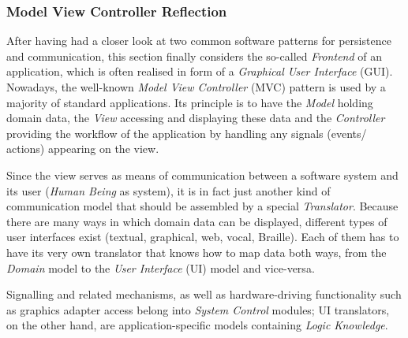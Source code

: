 %
%
%
%
%
%
%

\subsubsection{Model View Controller Reflection}
\label{model_view_controller_reflection_heading}

After having had a closer look at two common software patterns for persistence
and communication, this section finally considers the so-called \emph{Frontend}
of an application, which is often realised in form of a
\emph{Graphical User Interface} (GUI). Nowadays, the well-known
\emph{Model View Controller} (MVC) pattern is used by a majority of standard
applications. Its principle is to have the \emph{Model} holding domain data,
the \emph{View} accessing and displaying these data and the \emph{Controller}
providing the workflow of the application by handling any signals (events/
actions) appearing on the view.

Since the view serves as means of communication between a software system and
its user (\emph{Human Being} as system), it is in fact just another kind of
communication model that should be assembled by a special \emph{Translator}.
Because there are many ways in which domain data can be displayed, different
types of user interfaces exist (textual, graphical, web, vocal, Braille). Each
of them has to have its very own translator that knows how to map data both
ways, from the \emph{Domain} model to the \emph{User Interface} (UI) model and
vice-versa.

Signalling and related mechanisms, as well as hardware-driving functionality
such as graphics adapter access belong into \emph{System Control} modules; UI
translators, on the other hand, are application-specific models containing
\emph{Logic Knowledge}.
